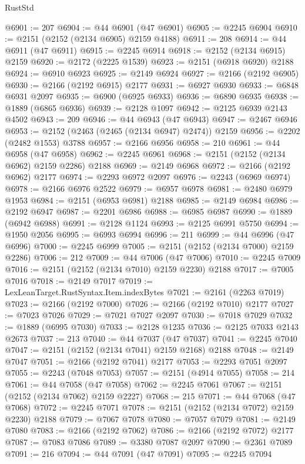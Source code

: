 \begin{lexlean}{RustStd}
\begin{coremodule}
@6901 := 207
@6904 := @44 @6901 (@47 @6901)
@6905 := @2245 @6904
@6910 := @2151 (@2152 (@2134 @6905) @2159 @4188)
@6911 := 208
@6914 := @44 @6911 (@47 @6911)
@6915 := @2245 @6914
@6918 := @2152 (@2134 @6915) @2159
@6920 := @2172 (@2225 @1539)
@6923 := @2151 (@6918 @6920) @2188
@6924 := @6910 @6923
@6925 := @2149 @6924
@6927 := @2166 (@2192 @6905)
@6930 := @2166 (@2192 @6915) @2177
@6931 := @6927 @6930
@6933 := @6848 @6931 @2097
@6935 := @6900 (@6925 @6933)
@6936 := @6890 @6935
@6938 := @1889 (@6865 @6936)
@6939 := @2128 @1097
@6942 := @2125 @6939 @2143 @4502
@6943 := 209
@6946 := @44 @6943 (@47 @6943)
@6947 := @2467 @6946
@6953 := @2152 (@2463 (@2465 (@2134 @6947) @2474)) @2159
@6956 := @2202 (@2482 @1553) @3788
@6957 := @2166 @6956
@6958 := 210
@6961 := @44 @6958 (@47 @6958)
@6962 := @2245 @6961
@6968 := @2151 (@2152 (@2134 @6962) @2159 @2286) @2188
@6969 := @2149 @6968
@6972 := @2166 (@2192 @6962) @2177
@6974 := @2293 @6972 @2097
@6976 := @2243 (@6969 @6974)
@6978 := @2166 @6976 @2522
@6979 := @6957 @6978
@6981 := @2480 @6979 @1953
@6984 := @2151 (@6953 @6981) @2188
@6985 := @2149 @6984
@6986 := @2192 @6947
@6987 := @2201 @6986
@6988 := @6985 @6987
@6990 := @1889 (@6942 @6988)
@6991 := @2128 @1124
@6993 := @2125 @6991 @5750
@6994 := @1950 @2056
@6995 := @6993 @6994
@6996 := 211
@6999 := @44 @6996 (@47 @6996)
@7000 := @2245 @6999
@7005 := @2151 (@2152 (@2134 @7000) @2159 @2286)
@7006 := 212
@7009 := @44 @7006 (@47 @7006)
@7010 := @2245 @7009
@7016 := @2151 (@2152 (@2134 @7010) @2159 @2230) @2188
@7017 := @7005 @7016
@7018 := @2149 @7017
@7019 := LexLeanTarget.RustSyntax.Item.indexBytes
@7021 := @2161 (@2263 @7019)
@7023 := @2166 (@2192 @7000)
@7026 := @2166 (@2192 @7010) @2177
@7027 := @7023 @7026
@7029 := @7021 @7027 @2097
@7030 := @7018 @7029
@7032 := @1889 (@6995 @7030)
@7033 := @2128 @1235
@7036 := @2125 @7033 @2143 @2673
@7037 := 213
@7040 := @44 @7037 (@47 @7037)
@7041 := @2245 @7040
@7047 := @2151 (@2152 (@2134 @7041) @2159 @2168) @2188
@7048 := @2149 @7047
@7051 := @2166 (@2192 @7041) @2177
@7053 := @2293 @7051 @2097
@7055 := @2243 (@7048 @7053)
@7057 := @2151 (@4914 @7055)
@7058 := 214
@7061 := @44 @7058 (@47 @7058)
@7062 := @2245 @7061
@7067 := @2151 (@2152 (@2134 @7062) @2159 @2227)
@7068 := 215
@7071 := @44 @7068 (@47 @7068)
@7072 := @2245 @7071
@7078 := @2151 (@2152 (@2134 @7072) @2159 @2230) @2188
@7079 := @7067 @7078
@7080 := @7057 @7079
@7081 := @2149 @7080
@7083 := @2166 (@2192 @7062)
@7086 := @2166 (@2192 @7072) @2177
@7087 := @7083 @7086
@7089 := @3380 @7087 @2097
@7090 := @2361 @7089
@7091 := 216
@7094 := @44 @7091 (@47 @7091)
@7095 := @2245 @7094

\end{coremodule}
\end{lexlean}

